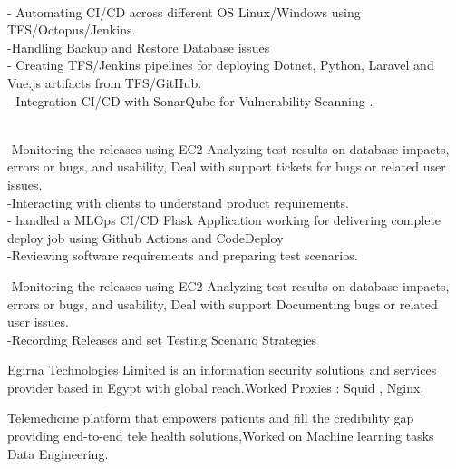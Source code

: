 \documentclass[letterpaper,11pt]{article}
\begin{document}
  
   \item{\textbf{}} \\ - Automating CI/CD across different OS Linux/Windows using TFS/Octopus/Jenkins.\\
-Handling Backup and Restore Database issues\\
- Creating TFS/Jenkins pipelines for deploying Dotnet, Python, Laravel and Vue.js artifacts from TFS/GitHub.\\
- Integration CI/CD with SonarQube for Vulnerability Scanning 
.
\item{\textbf{}} \\ -Monitoring the releases using EC2 Analyzing test results on database impacts, errors or bugs, and usability, Deal with support tickets for bugs or related user issues.\\
   -Interacting with clients to understand product requirements.\\
- handled a MLOps CI/CD Flask Application working for delivering complete deploy job using Github Actions and CodeDeploy \\

-Reviewing software requirements and preparing test scenarios.
   \item{\textbf{}}
      {-Monitoring the releases using EC2 Analyzing test results on database impacts, errors or bugs, and usability, Deal with support Documenting bugs or related user issues.\\ -Recording Releases and set Testing Scenario Strategies }
   \item{\textbf{}}
      {Egirna Technologies Limited is an information security solutions and services provider based in Egypt with global reach.Worked Proxies : Squid , Nginx.}


  
    \item{\textbf{}}
      {Telemedicine platform that empowers patients and fill the credibility gap providing end-to-end tele health solutions,Worked on Machine learning tasks Data Engineering.}  
\end{document}
